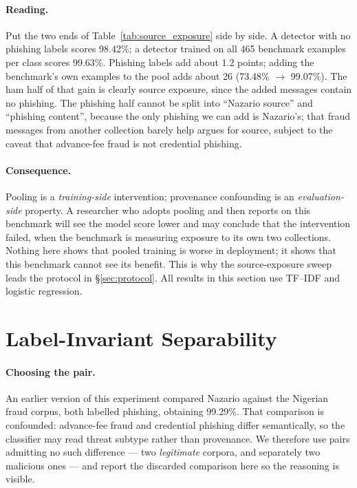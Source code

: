 \documentclass[twoside,11pt]{article}
\begin{document}
\paragraph{Reading.} Put the two ends of Table~\ref{tab:source_exposure} side
by side. A detector with no phishing labels scores 98.42\%; a detector
trained on all 465 benchmark examples per class scores 99.63\%. Phishing
labels add about 1.2 points; adding the benchmark's own examples to the pool
adds about 26 (73.48\% $\to$ 99.07\%). The ham half of that gain
is clearly source exposure, since the added messages contain no phishing. The
phishing half cannot be split into ``Nazario source'' and ``phishing content'',
because the only phishing we can add is Nazario's; that fraud messages from
another collection barely help argues for source, subject to the caveat that
advance-fee fraud is not credential phishing.

\paragraph{Consequence.} Pooling is a \emph{training-side} intervention;
provenance confounding is an \emph{evaluation-side} property. A researcher
who adopts pooling and then reports on this benchmark will see the model
score lower and may conclude that the intervention failed, when the benchmark
is measuring exposure to its own two collections. Nothing here shows that
pooled training is worse in deployment; it shows that this benchmark cannot
see its benefit. This is why the source-exposure sweep leads the protocol in
\S\ref{sec:protocol}. All results in this section use TF--IDF and logistic
regression.

\section{Label-Invariant Separability}
\label{sec:identity}

\paragraph{Choosing the pair.}
An earlier version of this experiment compared Nazario against the Nigerian
fraud corpus, both labelled phishing, obtaining 99.29\%. That comparison is
confounded: advance-fee fraud and credential phishing differ semantically, so
the classifier may read threat subtype rather than provenance. We therefore
use pairs admitting no such difference --- two \emph{legitimate} corpora, and
separately two malicious ones --- and report the discarded comparison here so
the reasoning is visible.
\end{document}
